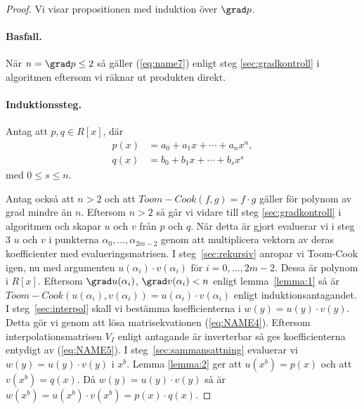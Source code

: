 \begin{proof}
Vi visar propositionen med induktion över $\grad p$.

\paragraph{Basfall.}
När $n = \grad p \leq 2$ så gäller (\ref{eq:name7}) enligt steg
\ref{sec:gradkontroll} i algoritmen eftersom vi räknar ut produkten direkt.

\paragraph{Induktionssteg.}
\label{sec:induktion}
Antag att $p, q \in R[x]$, där
\begin{align*}
  p(x) &= a_0 + a_1 x + \cdots + a_n x^n, \\
  q(x) &= b_0 + b_1 x + \cdots + b_s x^s
\end{align*}
med $0 \leq s \leq n$.

\bigskip\noindent
Antag också att $n > 2$ och att $Toom-Cook (f, g) =  f \cdot g$ gäller för polynom
av grad mindre än $n$. Eftersom $n > 2$ så går vi vidare till steg
\ref{sec:gradkontroll} i algoritmen och skapar $u$ och $v$ från $p$ och $q$. När
detta är gjort evaluerar vi i steg 3 $u$ och $v$ i punkterna $\alpha_0, \dots,
\alpha_{2m-2}$ genom att multiplicera vektorn av deras koefficienter med
evalueringsmatrisen. I steg~\ref{sec:rekursiv} anropar vi Toom-Cook igen, nu med
argumenten $u(\alpha_i) \cdot v(\alpha_i)$ för $i = 0, \ldots , 2m-2$. Dessa är
polynom i $R[x]$. Eftersom $\grad u(\alpha_i)$, $\grad v(\alpha_i) < n$ enligt
lemma~\ref{lemma:1} så är $Toom-Cook (u(\alpha_i), v(\alpha_i)) = u(\alpha_i) \cdot
v(\alpha_i)$ enligt induktionsantagandet. I steg~\ref{sec:interpol} skall vi
bestämma koefficienterna i $w(y)=u(y) \cdot v(y)$. Detta gör vi genom att lösa
matrisekvationen (\ref{eq:NAME4}). Eftersom interpolationsmatrisen $V_I$ enligt
antagande är inverterbar så ges koefficienterna entydigt av (\ref{eq:NAME5}). I
steg~\ref{sec:sammansattning} evaluerar vi $w(y)=u(y) \cdot v(y)$ i $x^b$. Lemma
\ref{lemma:2} ger att $u(x^b)=p(x)$ och att $v(x^b)=q(x)$. Då $w(y)=u(y) \cdot
v(y)$ så är $w(x^b)=u(x^b) \cdot v(x^b)=p(x) \cdot q(x)$.
\end{proof}

